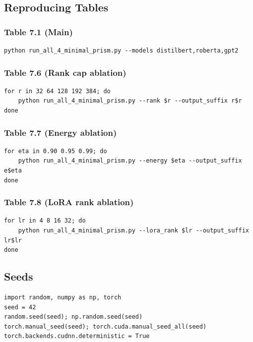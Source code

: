 \subsection{Reproducing Tables}

\subsubsection{Table 7.1 (Main)}
\begin{lstlisting}
python run_all_4_minimal_prism.py --models distilbert,roberta,gpt2
\end{lstlisting}

\subsubsection{Table 7.6 (Rank cap ablation)}
\begin{lstlisting}
for r in 32 64 128 192 384; do
    python run_all_4_minimal_prism.py --rank $r --output_suffix r$r
done
\end{lstlisting}

\subsubsection{Table 7.7 (Energy ablation)}
\begin{lstlisting}
for eta in 0.90 0.95 0.99; do
    python run_all_4_minimal_prism.py --energy $eta --output_suffix e$eta
done
\end{lstlisting}

\subsubsection{Table 7.8 (LoRA rank ablation)}
\begin{lstlisting}
for lr in 4 8 16 32; do
    python run_all_4_minimal_prism.py --lora_rank $lr --output_suffix lr$lr
done
\end{lstlisting}

\subsection{Seeds}

\begin{lstlisting}
import random, numpy as np, torch
seed = 42
random.seed(seed); np.random.seed(seed)
torch.manual_seed(seed); torch.cuda.manual_seed_all(seed)
torch.backends.cudnn.deterministic = True
\end{lstlisting}

